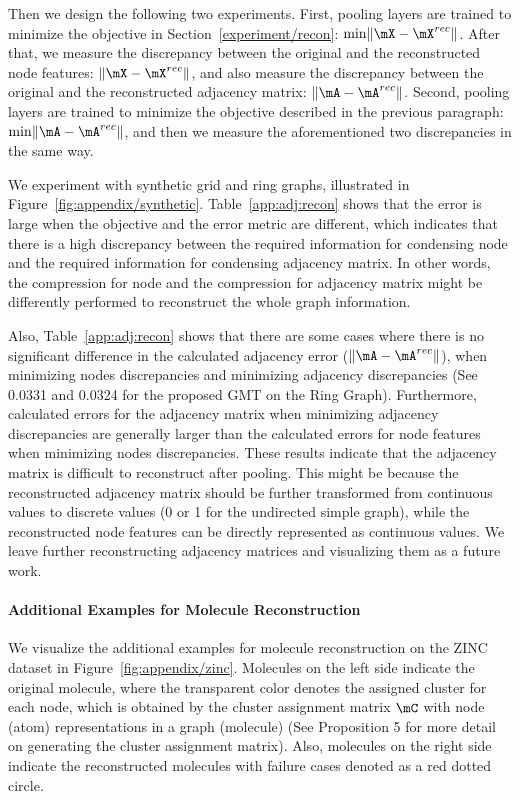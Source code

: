 Then we design the following two experiments. First, pooling layers are trained to minimize the objective in Section~\ref{experiment/recon}: $\min \lVert \mX - \mX^{rec} \rVert$. After that, we measure the discrepancy between the original and the reconstructed node features: $\lVert \mX - \mX^{rec} \rVert$, and also measure the discrepancy between the original and the reconstructed adjacency matrix: $\lVert \mA - \mA^{rec} \rVert$. Second, pooling layers are trained to minimize the objective described in the previous paragraph: $\min \lVert \mA - \mA^{rec} \rVert$, and then we measure the aforementioned two discrepancies in the same way.

We experiment with synthetic grid and ring graphs, illustrated in Figure~\ref{fig:appendix/synthetic}. Table~\ref{app:adj:recon} shows that the error is large when the objective and the error metric are different, which indicates that there is a high discrepancy between the required information for condensing node and the required information for condensing adjacency matrix. In other words, the compression for node and the compression for adjacency matrix might be differently performed to reconstruct the whole graph information. 

Also, Table~\ref{app:adj:recon} shows that there are some cases where there is no significant difference in the calculated adjacency error ($\lVert \mA - \mA^{rec} \rVert$), when minimizing nodes discrepancies and minimizing adjacency discrepancies (See 0.0331 and 0.0324 for the proposed GMT on the Ring Graph). Furthermore, calculated errors for the adjacency matrix when minimizing adjacency discrepancies are generally larger than the calculated errors for node features when minimizing nodes discrepancies. These results indicate that the adjacency matrix is difficult to reconstruct after pooling. This might be because the reconstructed adjacency matrix should be further transformed from continuous values to discrete values (0 or 1 for the undirected simple graph), while the reconstructed node features can be directly represented as continuous values. We leave further reconstructing adjacency matrices and visualizing them as a future work.



\paragraph{Additional Examples for Molecule Reconstruction}
We visualize the additional examples for molecule reconstruction on the ZINC dataset in Figure~\ref{fig:appendix/zinc}. Molecules on the left side indicate the original molecule, where the transparent color denotes the assigned cluster for each node, which is obtained by the cluster assignment matrix $\mC$ with node (atom) representations in a graph (molecule) (See Proposition 5 for more detail on generating the cluster assignment matrix). Also, molecules on the right side indicate the reconstructed molecules with failure cases denoted as a red dotted circle. 

